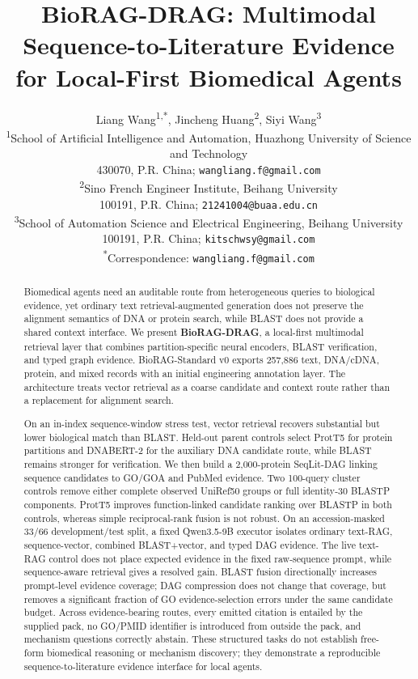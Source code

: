 \documentclass[11pt]{article}
\title{\textbf{BioRAG-DRAG: Multimodal Sequence-to-Literature Evidence for Local-First Biomedical Agents}}
\author{
Liang Wang\textsuperscript{1,*}, Jincheng Huang\textsuperscript{2},
Siyi Wang\textsuperscript{3}\\[0.4em]
\small \textsuperscript{1}School of Artificial Intelligence and Automation,
Huazhong University of Science and Technology\\
\small 430070, P.R. China; \texttt{wangliang.f@gmail.com}\\
\small \textsuperscript{2}Sino French Engineer Institute, Beihang University\\
\small 100191, P.R. China; \texttt{21241004@buaa.edu.cn}\\
\small \textsuperscript{3}School of Automation Science and Electrical Engineering,
Beihang University\\
\small 100191, P.R. China; \texttt{kitschwsy@gmail.com}\\[0.25em]
\small \textsuperscript{*}Correspondence: \texttt{wangliang.f@gmail.com}
}
\date{}
\begin{document}
\maketitle

\begin{abstract}
Biomedical agents need an auditable route from heterogeneous queries to biological evidence, yet ordinary text retrieval-augmented generation does not preserve the alignment semantics of DNA or protein search, while BLAST does not provide a shared context interface. We present \textbf{BioRAG-DRAG}, a local-first multimodal retrieval layer that combines partition-specific neural encoders, BLAST verification, and typed graph evidence. BioRAG-Standard v0 exports 257,886 text, DNA/cDNA, protein, and mixed records with an initial engineering annotation layer. The architecture treats vector retrieval as a coarse candidate and context route rather than a replacement for alignment search.

On an in-index sequence-window stress test, vector retrieval recovers substantial but lower biological match than BLAST. Held-out parent controls select ProtT5 for protein partitions and DNABERT-2 for the auxiliary DNA candidate route, while BLAST remains stronger for verification. We then build a 2,000-protein SeqLit-DAG linking sequence candidates to GO/GOA and PubMed evidence. Two 100-query cluster controls remove either complete observed UniRef50 groups or full identity-30 BLASTP components. ProtT5 improves function-linked candidate ranking over BLASTP in both controls, whereas simple reciprocal-rank fusion is not robust. On an accession-masked 33/66 development/test split, a fixed Qwen3.5-9B executor isolates ordinary text-RAG, sequence-vector, combined BLAST+vector, and typed DAG evidence. The live text-RAG control does not place expected evidence in the fixed raw-sequence prompt, while sequence-aware retrieval gives a resolved gain. BLAST fusion directionally increases prompt-level evidence coverage; DAG compression does not change that coverage, but removes a significant fraction of GO evidence-selection errors under the same candidate budget. Across evidence-bearing routes, every emitted citation is entailed by the supplied pack, no GO/PMID identifier is introduced from outside the pack, and mechanism questions correctly abstain. These structured tasks do not establish free-form biomedical reasoning or mechanism discovery; they demonstrate a reproducible sequence-to-literature evidence interface for local agents.
\end{abstract}
\end{document}

